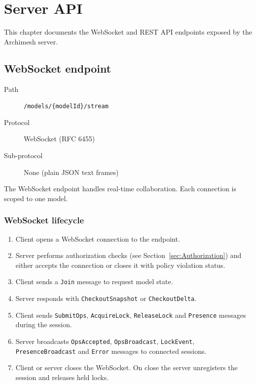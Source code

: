 \section{Server API}
\label{sec:ServerApi}

This chapter documents the WebSocket and REST API endpoints exposed by the
Archimesh server.

\subsection{WebSocket endpoint}

\begin{description}
\item[Path] \texttt{/models/\{modelId\}/stream}
\item[Protocol] WebSocket (RFC 6455)
\item[Sub-protocol] None (plain JSON text frames)
\end{description}

The WebSocket endpoint handles real-time collaboration. Each connection is
scoped to one model.

\subsubsection{WebSocket lifecycle}

\begin{enumerate}
\item Client opens a WebSocket connection to the endpoint.
\item Server performs authorization checks (see
  Section~\ref{sec:Authorization}) and either accepts the connection or
  closes it with policy violation status.
\item Client sends a \texttt{Join} message to request model state.
\item Server responds with \texttt{CheckoutSnapshot} or
  \texttt{CheckoutDelta}.
\item Client sends \texttt{SubmitOps}, \texttt{AcquireLock},
  \texttt{ReleaseLock} and \texttt{Presence} messages during the session.
\item Server broadcasts \texttt{OpsAccepted}, \texttt{OpsBroadcast},
  \texttt{LockEvent}, \texttt{PresenceBroadcast} and \texttt{Error}
  messages to connected sessions.
\item Client or server closes the WebSocket. On close the server unregisters
  the session and releases held locks.
\end{enumerate}

